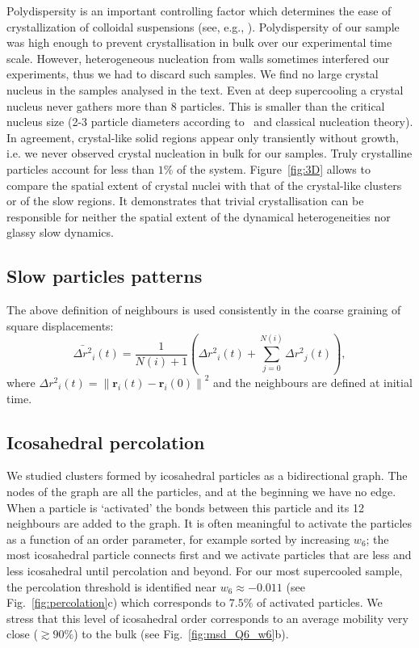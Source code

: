 Polydispersity is an important controlling factor which determines the ease of crystallization of colloidal suspensions (see, e.g., \cite{Zaccarelli2009}). 
Polydispersity of our sample was high enough to prevent crystallisation in bulk over our experimental time scale. 
However, heterogeneous nucleation from walls sometimes interfered our experiments, thus we had to discard such samples. 
We find no large crystal nucleus in the samples analysed in the text. Even at deep supercooling a crystal nucleus never gathers more than 8 particles. This is smaller than the critical nucleus size (2-3 particle diameters according to~\cite{Auer2001} and classical nucleation theory). In agreement, crystal-like solid regions appear only transiently without growth, i.e. we never observed crystal nucleation in bulk for our samples. Truly crystalline particles account for less than $1\%$ of the system. Figure~\ref{fig:3D} allows to compare the spatial extent of crystal nuclei with that of the crystal-like clusters or of the slow regions. It demonstrates that trivial crystallisation can be responsible for neither the spatial extent of the dynamical heterogeneities nor glassy slow dynamics.

\subsection*{Slow particles patterns}

The above definition of neighbours is used consistently in the coarse graining of square displacements:
\begin{equation}
	\bar{\Delta r^2}_i(t) = \frac{1}{N(i)+1}\left( {\Delta r^2}_i(t) + \sum_{j=0}^{N(i)} {\Delta r^2}_j(t) \right),
	\label{eq:Mu}
\end{equation}
where ${\Delta r^2}_i(t) = \left\|\mathbf{r}_i(t)-\mathbf{r}_i(0)\right\|^2$ and the neighbours are defined at initial time. 

\subsection*{Icosahedral percolation}

We studied clusters formed by icosahedral particles as a bidirectional graph. The nodes of the graph are all the particles, and at the beginning we have no edge. When a particle is `activated' the bonds between this particle and its 12 neighbours are added to the graph. It is often meaningful to activate the particles as a function of an order parameter, for example sorted by increasing $w_6$; the most icosahedral particle connects first and we activate particles that are less and less icosahedral until percolation and beyond. For our most supercooled sample, the percolation threshold is identified near $w_6\approx -0.011$ (see Fig.~\ref{fig:percolation}c) which corresponds to $7.5\%$ of activated particles. We stress that this level of icosahedral order corresponds to an average mobility very close ($\gtrsim 90\%$) to the bulk (see Fig.~\ref{fig:msd_Q6_w6}b).


